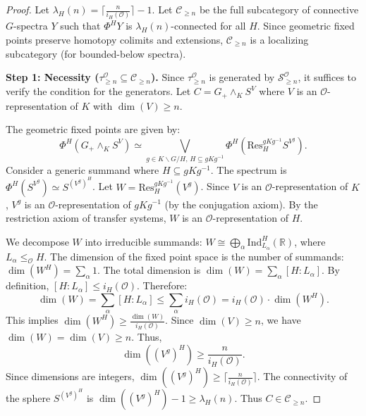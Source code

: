 \documentclass[11pt]{article}
\theoremstyle{plain}
\theoremstyle{definition}
\newcommand{\Ocal}{\mathcal{O}}
\newcommand{\Ind}{\mathrm{Ind}}
\newcommand{\Res}{\mathrm{Res}}
\newcommand{\ceil}[1]{\lceil #1 \rceil}
\begin{document}
\begin{proof}
    Let $\lambda_H(n) = \ceil{\frac{n}{i_H(\Ocal)}} - 1$. Let $\mathcal{C}_{\ge n}$ be the full subcategory of connective $G$-spectra $Y$ such that $\Phi^H Y$ is $\lambda_H(n)$-connected for all $H$. Since geometric fixed points preserve homotopy colimits and extensions, $\mathcal{C}_{\ge n}$ is a localizing subcategory (for bounded-below spectra).
    
    \textbf{Step 1: Necessity ($\tau_{\ge n}^\Ocal \subseteq \mathcal{C}_{\ge n}$).}
    Since $\tau_{\ge n}^\Ocal$ is generated by $\mathcal{S}_{\ge n}^\Ocal$, it suffices to verify the condition for the generators. Let $C = G_+ \wedge_K S^V$ where $V$ is an $\Ocal$-representation of $K$ with $\dim(V) \ge n$.
    
    The geometric fixed points are given by:
    \[
    \Phi^H(G_+ \wedge_K S^V) \simeq \bigvee_{g \in K \backslash G / H, \, H \subseteq gKg^{-1}} \Phi^H(\Res^{gKg^{-1}}_H S^{V^g}).
    \]
    Consider a generic summand where $H \subseteq gKg^{-1}$. The spectrum is $\Phi^H(S^{V^g}) \simeq S^{(V^g)^H}$. Let $W = \Res^{gKg^{-1}}_H (V^g)$. Since $V$ is an $\Ocal$-representation of $K$, $V^g$ is an $\Ocal$-representation of $gKg^{-1}$ (by the conjugation axiom). By the restriction axiom of transfer systems, $W$ is an $\Ocal$-representation of $H$.
    
    We decompose $W$ into irreducible summands: $W \cong \bigoplus_{\alpha} \Ind_{L_\alpha}^H (\mathbb{R})$, where $L_\alpha \le_{\Ocal} H$.
    The dimension of the fixed point space is the number of summands: $\dim(W^H) = \sum_\alpha 1$.
    The total dimension is $\dim(W) = \sum_\alpha [H:L_\alpha]$.
    By definition, $[H:L_\alpha] \le i_H(\Ocal)$. Therefore:
    \[
    \dim(W) = \sum_\alpha [H:L_\alpha] \le \sum_\alpha i_H(\Ocal) = i_H(\Ocal) \cdot \dim(W^H).
    \]
    This implies $\dim(W^H) \ge \frac{\dim(W)}{i_H(\Ocal)}$.
    Since $\dim(V) \ge n$, we have $\dim(W) = \dim(V) \ge n$. Thus,
    \[
    \dim((V^g)^H) \ge \frac{n}{i_H(\Ocal)}.
    \]
    Since dimensions are integers, $\dim((V^g)^H) \ge \ceil{\frac{n}{i_H(\Ocal)}}$. The connectivity of the sphere $S^{(V^g)^H}$ is $\dim((V^g)^H) - 1 \ge \lambda_H(n)$. Thus $C \in \mathcal{C}_{\ge n}$.
    

\end{proof}
\end{document}
